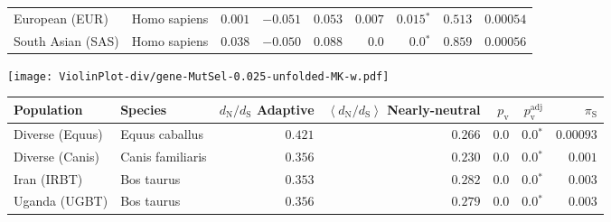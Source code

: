\begin{center}
\begin{adjustbox}{width = 1\textwidth}
\begin{tabular}{|l|l|r|r|r|r|r|r|r|}
                 European (EUR) &         Homo sapiens &                                        $ 0.001$ &                                           $-0.051$ &                      $ 0.053$ &         $ 0.007$ &               $\bm{ 0.015{^*}}$ &                                           $ 0.513$ &          $0.00054$ \\
              South Asian (SAS) &         Homo sapiens &                                        $ 0.038$ &                                           $-0.050$ &                      $ 0.088$ &            $0.0$ &                  $\bm{0.0{^*}}$ &                                           $ 0.859$ &          $0.00056$ \\
\bottomrule
\end{tabular}
\end{adjustbox}
\newpage
\texttt{[image: ViolinPlot-div/gene-MutSel-0.025-unfolded-MK-w.pdf]} 
\begin{adjustbox}{width = 1\textwidth}
\begin{tabular}{|l|l|r|r|r|r|r|}
\toprule
                     Population &              Species & \specialcell{$d_{\mathrm{N}} / d_{\mathrm{S}}$ \\ Adaptive} & \specialcell{$\left< d_{\mathrm{N}} / d_{\mathrm{S}} \right>$ \\ Nearly-neutral} & $p_{\mathrm{v}}$ & $p_{\mathrm{v}}^{\mathrm{adj}}$ & $\pi_{\textrm{S}}$ \\
\midrule
                Diverse (Equus) &       Equus caballus &                                           $ 0.421$ &                                           $ 0.266$ &            $0.0$ &                  $\bm{0.0{^*}}$ &          $0.00093$ \\
                Diverse (Canis) &     Canis familiaris &                                           $ 0.356$ &                                           $ 0.230$ &            $0.0$ &                  $\bm{0.0{^*}}$ &           $ 0.001$ \\
                    Iran (IRBT) &           Bos taurus &                                           $ 0.353$ &                                           $ 0.282$ &            $0.0$ &                  $\bm{0.0{^*}}$ &           $ 0.003$ \\
                  Uganda (UGBT) &           Bos taurus &                                           $ 0.356$ &                                           $ 0.279$ &            $0.0$ &                  $\bm{0.0{^*}}$ &           $ 0.003$ \\

\end{tabular}
\end{adjustbox}
\end{center}
